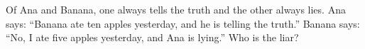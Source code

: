 Of Ana and Banana, one always tells the truth and the other always lies. Ana says: ``Banana ate ten apples yesterday, and he is telling the truth.'' Banana says: ``No, I ate five apples yesterday, and Ana is lying.'' Who is the liar?

